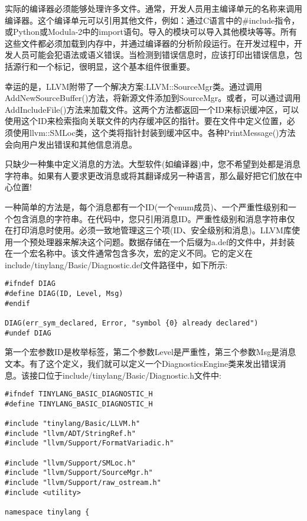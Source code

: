 实际的编译器必须能够处理许多文件。通常，开发人员用主编译单元的名称来调用编译器。这个编译单元可以引用其他文件，例如：通过C语言中的\#include指令，或Python或Modula-2中的import语句。导入的模块可以导入其他模块等等。所有这些文件都必须加载到内存中，并通过编译器的分析阶段运行。在开发过程中，开发人员可能会犯语法或语义错误。当检测到错误信息时，应该打印出错误信息，包括源行和一个标记，很明显，这个基本组件很重要。\par

幸运的是，LLVM附带了一个解决方案:LLVM::SourceMgr类。通过调用AddNewSourceBuffer()方法，将新源文件添加到SourceMgr。或者，可以通过调用AddIncludeFile()方法来加载文件。这两个方法都返回一个ID来标识缓冲区，可以使用这个ID来检索指向关联文件的内存缓冲区的指针。要在文件中定义位置，必须使用llvm::SMLoc类，这个类将指针封装到缓冲区中。各种PrintMessage()方法会向用户发出错误和其他信息消息。\par

只缺少一种集中定义消息的方法。大型软件(如编译器)中，您不希望到处都是消息字符串。如果有人要求更改消息或将其翻译成另一种语言，那么最好把它们放在中心位置!\par

一种简单的方法是，每个消息都有一个ID(一个enum成员)、一个严重性级别和一个包含消息的字符串。在代码中，您只引用消息ID。严重性级别和消息字符串仅在打印消息时使用。必须一致地管理这三个项(ID、安全级别和消息)。LLVM库使用一个预处理器来解决这个问题。数据存储在一个后缀为a.def的文件中，并封装在一个宏名称中。该文件通常包含多次，宏的定义不同。它的定义在include/tinylang/Basic/Diagnostic.def文件路径中，如下所示:\par

\begin{lstlisting}[caption={}]
#ifndef DIAG
#define DIAG(ID, Level, Msg)
#endif

DIAG(err_sym_declared, Error, "symbol {0} already declared")
#undef DIAG
\end{lstlisting}

第一个宏参数ID是枚举标签，第二个参数Level是严重性，第三个参数Msg是消息文本。有了这个定义，我们就可以定义一个DiagnosticsEngine类来发出错误消息。该接口位于include/tinylang/\allowbreak Basic/Diagnostic.h文件中:\par

\begin{lstlisting}[caption={}]
#ifndef TINYLANG_BASIC_DIAGNOSTIC_H
#define TINYLANG_BASIC_DIAGNOSTIC_H

#include "tinylang/Basic/LLVM.h"
#include "llvm/ADT/StringRef.h"
#include "llvm/Support/FormatVariadic.h"

#include "llvm/Support/SMLoc.h"
#include "llvm/Support/SourceMgr.h"
#include "llvm/Support/raw_ostream.h"
#include <utility>

namespace tinylang {
\end{lstlisting}

